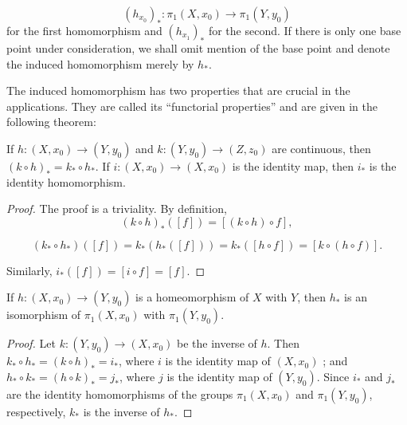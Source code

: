 \[
{( h_{x_{0}}) }_{ * } : {\pi }_{1}( {X,x_{0}}) \rightarrow {\pi }_{1}( {Y,y_{0}})
\]
for the first homomorphism and \({( h_{x_{1}}) }_{ * }\) for the second. If there is only one base point under consideration, we shall omit mention of the base point and denote the induced homomorphism merely by \(h_{ * }\).

The induced homomorphism has two properties that are crucial in the applications. They are called its ``functorial properties'' and are given in the following theorem:

\begin{theorem}
\label{thm:\thetheorem}
If \(h : ( {X,x_{0}}) \rightarrow ( {Y,y_{0}})\) and \(k : ( {Y,y_{0}}) \rightarrow ( {Z,z_{0}})\) are continuous, then \({( k \circ h) }_{ * } = k_{ * } \circ {h}_{ * }\). If \(i : ( {X,x_{0}}) \rightarrow ( {X,x_{0}})\) is the identity map, then \(i_{ * }\) is the identity homomorphism.
\end{theorem}

\begin{proof}
The proof is a triviality. By definition,
\[
{( k \circ h) }_{ * }( [ f] ) = [ {( {k \circ h}) \circ f}] ,
\]

\[
( {k_{ * } \circ {h}_{ * }}) ( [ f] ) = k_{ * }( {h_{ * }( [ f] ) }) = k_{ * }( [ {h \circ f}] ) = [ {k \circ ( {h \circ f}) }] .
\]

Similarly, \(i_{ * }( [ f] ) = [ {i \circ f}] = [ f]\).
\end{proof}
\begin{corollary}
\label{cor:\thetheorem}
If \(h : ( {X,x_{0}}) \rightarrow ( {Y,y_{0}})\) is a homeomorphism of \(X\) with \(Y\), then \(h_{ * }\) is an isomorphism of \({\pi }_{1}( {X,x_{0}})\) with \({\pi }_{1}( {Y,y_{0}})\).
\end{corollary}

\begin{proof}
Let \(k : ( {Y,y_{0}}) \rightarrow ( {X,x_{0}})\) be the inverse of \(h\). Then \(k_{ * } \circ {h}_{ * } = {( k \circ h) }_{ * } = i_{ * }\), where \(i\) is the identity map of \(( {X,x_{0}})\) ; and \(h_{ * } \circ {k}_{ * } = {( h \circ k) }_{ * } = j_{ * }\), where \(j\) is the identity map of \(( {Y,y_{0}})\). Since \(i_{ * }\) and \(j_{ * }\) are the identity homomorphisms of the groups \({\pi }_{1}( {X,x_{0}})\) and \({\pi }_{1}( {Y,y_{0}})\), respectively, \(k_{ * }\) is the inverse of \(h_{ * }\).
\end{proof}
